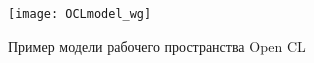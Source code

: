 \begin{figure}[h!]
  \centering
  \texttt{[image: OCLmodel\_wg]} 
  \caption{Пример модели рабочего пространства Open CL}
  \label{fig:OCL_wg}
\end{figure}
\FloatBarrier






